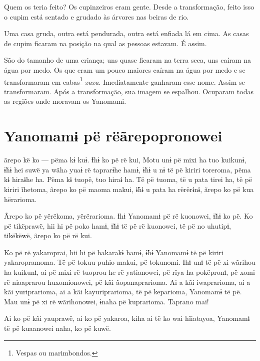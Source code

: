 Quem os teria feito? Os cupinzeiros eram gente. Desde a
transformação, feito isso o cupim está sentado e grudado às árvores nas
beiras de rio.

Uma casa gruda, outra está pendurada, outra está enfiada lá em cima. As
casas de cupim ficaram na posição na qual as pessoas estavam.
É assim. 

São do tamanho de uma criança; uns quase ficaram na terra seca, uns
caíram na água por medo. Os que eram um pouco maiores caíram na água por
medo e se transformaram em cabas\footnote{Vespas ou marimbondos.} \textit{xaxa}. Imediatamente ganharam esse nome. Assim se transformaram. Após a transformação,
sua imagem se espalhou. Ocuparam todas as regiões onde moravam os
Yanomami. 

\chapter[Yanomamɨ pë rë ãrepopronowei]{Yanomamɨ pë rë\break ãrepopronowei}

 ãrepo kë ko --- pëma kɨ kuɨ. Ɨhɨ ko pë rë kui, Motu unɨ pë mixi ha tuo kuikunɨ, ɨ̃hɨ hei suwë ya wãha
yuaɨ rë taprarɨhe hamɨ, ɨ̃hɨ u nɨ të pë kiriri toreroma, pëma kɨ hiraɨhe
ha. Pëma kɨ tuopë, tuo hiraɨ ha. Të pë tuoma, të u pata tirei ha, të pë
kiriri ĩhetoma, ãrepo ko pë maoma makui, ɨ̃hɨ u pata ha rërërɨnɨ, ãrepo
ko pë kua hërarioma. 

Ãrepo ko pë yërëkoma, yërërarioma. Ɨhɨ Yanomamɨ pë rë kuonowei, ɨ̃hɨ ko
pë. Ko pë tikëprawë, hii hi pë poko hamɨ, ɨ̃hɨ të pë rë kuonowei, të pë
no uhutipɨ, tikëkëwë, ãrepo ko pë rë kui. 

Ko pë rë yakaroprai, hii hi pë hakarakɨ hamɨ, ɨ̃hɨ Yanomamɨ të pë kiriri
yakaropramoma. Të pë tokuu puhio makui, pë tokunomi. Ɨhɨ unɨ të pë xi
wãrihou ha kuikunɨ, ai pë mixi rë tuoprou he rë yatianowei, pë rĩya ha
pokëpronɨ, pë xomi rë niaaprarou huxomionowei, pë kãi ãopanaprarioma. Ai
a kãi iwaprarioma, ai a kãi yuriprarioma, ai a kãi kayuriprarioma, të pë
keparioma, Yanomamɨ të pë. Mau unɨ pë xi rë wãrihonowei, ɨnaha pë
kuprarioma. Taprano mai! 


Ai ko pë kãi yauprawë, ai ko pë yakaroa, kiha ai të ko wai hĩiatayoa,
Yanomamɨ të pë kuaanowei naha, ko pë kuwë. 

